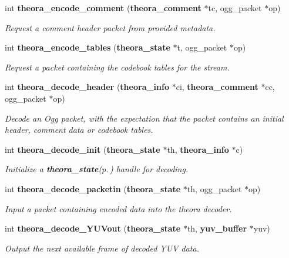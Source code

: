 \begin{CompactItemize}
int {\bf theora\_\-encode\_\-comment} ({\bf theora\_\-comment} $\ast$tc, ogg\_\-packet $\ast$op)
\begin{CompactList}\small\item\em Request a comment header packet from provided metadata. \item\end{CompactList}\item 
int {\bf theora\_\-encode\_\-tables} ({\bf theora\_\-state} $\ast$t, ogg\_\-packet $\ast$op)
\begin{CompactList}\small\item\em Request a packet containing the codebook tables for the stream. \item\end{CompactList}\item 
int {\bf theora\_\-decode\_\-header} ({\bf theora\_\-info} $\ast$ci, {\bf theora\_\-comment} $\ast$cc, ogg\_\-packet $\ast$op)
\begin{CompactList}\small\item\em Decode an Ogg packet, with the expectation that the packet contains an initial header, comment data or codebook tables. \item\end{CompactList}\item 
int {\bf theora\_\-decode\_\-init} ({\bf theora\_\-state} $\ast$th, {\bf theora\_\-info} $\ast$c)
\begin{CompactList}\small\item\em Initialize a {\bf theora\_\-state}{\rm (p.\,\pageref{structtheora__state})} handle for decoding. \item\end{CompactList}\item 
int {\bf theora\_\-decode\_\-packetin} ({\bf theora\_\-state} $\ast$th, ogg\_\-packet $\ast$op)
\begin{CompactList}\small\item\em Input a packet containing encoded data into the theora decoder. \item\end{CompactList}\item 
int {\bf theora\_\-decode\_\-YUVout} ({\bf theora\_\-state} $\ast$th, {\bf yuv\_\-buffer} $\ast$yuv)
\begin{CompactList}\small\item\em Output the next available frame of decoded YUV data. \item\end{CompactList}\item 

\end{CompactItemize}
